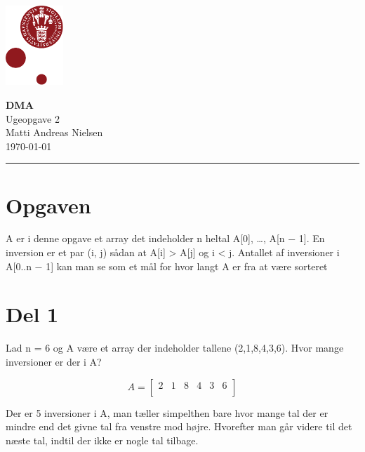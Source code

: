 \documentclass[12pt, a4paper, hidelinks]{article}
\begin{document}
\begin{minipage}[b]{1.0\linewidth}
\includegraphics[height=30mm]{bilag/KULogo}

\vspace*{-16ex}
\begin{center}
    {\Large \bf DMA} \vspace*{1ex} \\
    {\large Ugeopgave 2} \vspace*{1ex} \\
    {\large Matti Andreas Nielsen  } \\
    {\large \today{}  }
\end{center}
\vspace*{-3pt}
{\color{KU-red}\hrule}
\end{minipage}
\vspace{2ex}

\tableofcontents \newpage

\section{Opgaven}
A er i denne opgave et array det indeholder n heltal A[0], \ldots{}, A[n − 1]. En inversion er et par (i, j) sådan at A[i] > A[j] og i < j. Antallet af inversioner i A[0..n − 1] kan man se som et mål for hvor langt A er fra at være sorteret

\section{Del 1}
Lad n = 6 og A være et array der indeholder tallene (2,1,8,4,3,6). Hvor mange
inversioner er der i A?

\[
A =
  \begin{bmatrix}
      2 & 1 & 8 & 4 & 3 & 6 \\
  \end{bmatrix}
\]

Der er 5 inversioner i A, man tæller simpelthen bare hvor mange tal der er mindre end det givne tal fra venstre mod højre. Hvorefter man går videre til det næste tal, indtil der ikke er nogle tal tilbage.
\end{document}
